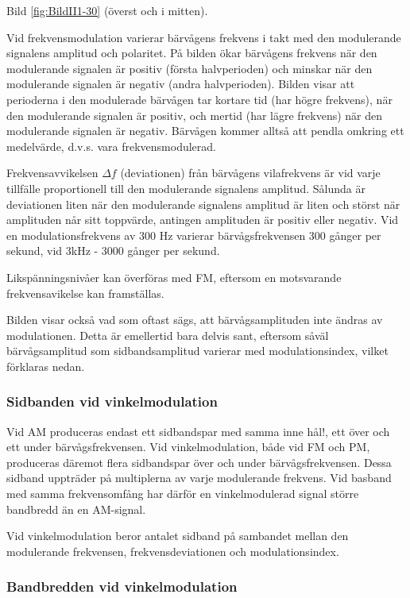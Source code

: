 Bild \ref{fig:BildII1-30} (överst och i mitten).

Vid frekvensmodulation varierar bärvågens frekvens i takt med den modulerande
signalens amplitud och polaritet. På bilden ökar bärvågens frekvens när den
modulerande signalen är positiv (första halvperioden) och minskar när den
modulerande signalen är negativ (andra halvperioden). Bilden visar att
perioderna i den modulerade bärvågen tar kortare tid (har högre frekvens), när
den modulerande signalen är positiv, och mertid (har lägre frekvens) när den
modulerande signalen är negativ. Bärvågen kommer alltså att pendla omkring ett
medelvärde, d.v.s. vara frekvensmodulerad.

Frekvensavvikelsen \(\Delta f\) (deviationen) från bärvågens vilafrekvens är
vid varje tillfälle proportionell till den modulerande signalens amplitud.
Sålunda är deviationen liten när den modulerande signalens amplitud är liten
och störst när amplituden når sitt toppvärde, antingen amplituden är positiv
eller negativ. Vid en modulationsfrekvens av 300 Hz varierar bärvågsfrekvensen
300 gånger per sekund, vid 3kHz - 3000 gånger per sekund.

Likspänningsnivåer kan överföras med FM, eftersom en motsvarande
frekvensavikelse kan framställas.

Bilden visar också vad som oftast sägs, att bärvågsamplituden inte ändras av
modulationen. Detta är emellertid bara delvis sant, eftersom såväl
bärvågsamplitud som sidbandsamplitud varierar med modulationsindex, vilket
förklaras nedan.

\subsubsection{Sidbanden vid vinkelmodulation}

Vid AM produceras endast ett sidbandspar med samma inne hål!, ett över och ett
under bärvågsfrekvensen. Vid vinkelmodulation, både vid FM och PM, produceras
däremot flera sidbandspar över och under bärvågsfrekvensen. Dessa sidband
uppträder på multiplerna av varje modulerande frekvens. Vid basband med samma
frekvensomfång har därför en vinkelmodulerad signal större bandbredd än en
AM-signal.

Vid vinkelmodulation beror antalet sidband på sambandet mellan den modulerande
frekvensen, frekvensdeviationen och modulationsindex.

\subsubsection{Bandbredden vid vinkelmodulation}

